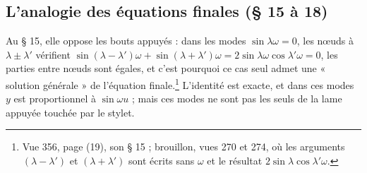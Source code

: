\documentclass[11pt,a4paper]{article}
\begin{document}
\subsection*{L'analogie des équations finales (§ 15 à 18)}

Au § 15, elle oppose les bouts appuyés : dans les modes $\sin\lambda\omega=0$, les nœuds à $\lambda\pm\lambda'$ vérifient $\sin(\lambda-\lambda')\omega+\sin(\lambda+\lambda')\omega=2\sin\lambda\omega\cos\lambda'\omega=0$, les parties entre nœuds sont égales, et c'est pourquoi ce cas seul admet une « solution générale » de l'équation finale.\footnote{Vue 356, page (19), son § 15 ; brouillon, vues 270 et 274, où les arguments $(\lambda-\lambda')$ et $(\lambda+\lambda')$ sont écrits sans $\omega$ et le résultat $2\sin\lambda\cos\lambda'\omega$.} L'identité est exacte, et dans ces modes $y$ est proportionnel à $\sin\omega u$ ; mais ces modes ne sont pas les seuls de la lame appuyée touchée par le stylet.
\end{document}
